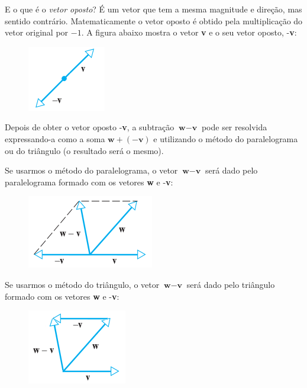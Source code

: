 \documentclass[pdftex, brazil, 12pt, twoside]{article}
\newcommand{\vet}[1]{\textbf{#1}}
\begin{document}
E o que é o \emph{vetor oposto}? É um vetor que tem a mesma magnitude e direção,
mas sentido contrário. Matematicamente o vetor oposto é obtido pela multiplicação
do vetor original por $-1$. A figura abaixo mostra o vetor \vet{v} e o seu vetor oposto,
-\vet{v}:

\begin{figure}[H]
  \begin{center}
    \includegraphics[scale=0.6]{imagens/vet007.png}
  \end{center}
\end{figure}

Depois de obter o vetor oposto -\vet{v}, a subtração $\vet{w} - \vet{v}$ pode ser
resolvida expressando-a como a soma $\vet{w} + (-\vet{v})$ e utilizando o método
do paralelograma ou do triângulo (o resultado será o mesmo).

Se usarmos o método do paralelograma, o vetor $\vet{w} - \vet{v}$ será dado
pelo paralelograma formado com os vetores \vet{w} e -\vet{v}:

\begin{figure}[H]
  \begin{center}
    \includegraphics[scale=0.6]{imagens/vet008.png}
  \end{center}
\end{figure}

Se usarmos o método do triângulo, o vetor $\vet{w} - \vet{v}$ será dado
pelo triângulo formado com os vetores \vet{w} e -\vet{v}:

\begin{figure}[H]
  \begin{center}
    \includegraphics[scale=0.6]{imagens/vet009.png}
  \end{center}
\end{figure}
\end{document}
